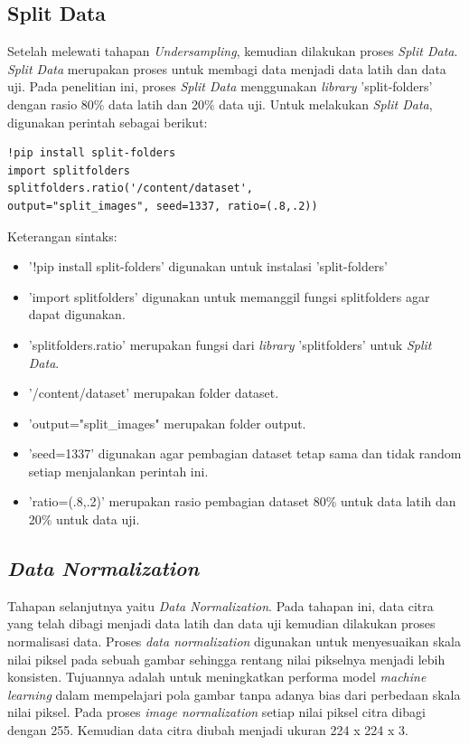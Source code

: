 \subsection{Split Data}
Setelah melewati tahapan \textit{Undersampling}, kemudian dilakukan proses \textit{Split Data}. \textit{Split Data} merupakan proses untuk membagi data menjadi data latih dan data uji. Pada penelitian ini, proses \textit{Split Data} menggunakan \textit{library} 'split-folders' dengan rasio 80\% data latih dan 20\% data uji. Untuk melakukan \textit{Split Data}, digunakan perintah sebagai berikut:

\begin{lstlisting}[style=customc]
!pip install split-folders
import splitfolders
splitfolders.ratio('/content/dataset', 
output="split_images", seed=1337, ratio=(.8,.2))
\end{lstlisting}

Keterangan sintaks:
\begin{itemize}
    \item '!pip install split-folders' digunakan untuk instalasi 'split-folders'
    \item 'import splitfolders' digunakan untuk memanggil fungsi splitfolders agar dapat digunakan.
    \item 'splitfolders.ratio' merupakan fungsi dari \textit{library} 'splitfolders' untuk \textit{Split Data}.
    \item '/content/dataset' merupakan folder dataset.
    \item 'output="split\_images" merupakan folder output.
    \item 'seed=1337' digunakan agar pembagian dataset tetap sama dan tidak random setiap menjalankan perintah ini.
    \item 'ratio=(.8,.2)' merupakan rasio pembagian dataset 80\% untuk data latih dan 20\% untuk data uji.
\end{itemize}

\subsection{\textit{Data Normalization}}
Tahapan selanjutnya yaitu \textit{Data Normalization}. Pada tahapan ini, data citra yang telah dibagi menjadi data latih dan data uji kemudian dilakukan proses normalisasi data. Proses \textit{data normalization} digunakan untuk menyesuaikan skala nilai piksel pada sebuah gambar sehingga rentang nilai pikselnya menjadi lebih konsisten. Tujuannya adalah untuk meningkatkan performa model \textit{machine learning} dalam mempelajari pola gambar tanpa adanya bias dari perbedaan skala nilai piksel. Pada proses \textit{image normalization} setiap nilai piksel citra dibagi dengan 255. Kemudian data citra diubah menjadi ukuran 224 x 224 x 3.

